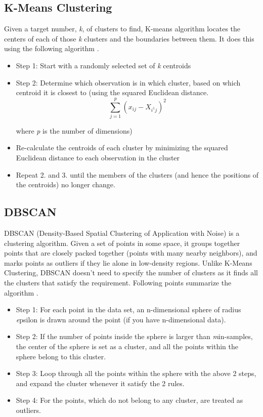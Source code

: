 \documentclass[9pt,twocolumn,twoside]{../../styles/osajnl}
\begin{document}
\subsection{K-Means Clustering}
Given a target number, \emph k, of clusters to find, K-means algorithm locates the centers of each of those \emph k clusters and the boundaries between them. It does this using the following algorithm \cite{www-kmeans}.
\begin{itemize}
    
    \item Step 1: Start with a randomly selected set of \emph k centroids 

    \item Step 2: Determine which observation is in which cluster, based on which centroid it is closest to (using the squared Euclidean distance. 
    \[   \sum_{j=1}^p (x_{ij} - X_{i^1j})^2   \]
    
    where \emph p is the number of dimensions)
    
    \item Re-calculate the centroids of each cluster by minimizing the squared Euclidean distance to each observation in the cluster
    
    \item Repeat 2. and 3. until the members of the clusters (and hence the positions of the centroids) no longer change.

\end{itemize}

\subsection{DBSCAN}
DBSCAN (Density-Based Spatial Clustering of Application with Noise) is a clustering algorithm. Given a set of points in some space, it groups together points that are closely packed together (points with many nearby neighbors), and marks points as outliers if they lie alone in low-density regions. Unlike K-Means Clustering, DBSCAN doesn't need to specify the number of clusters as it finds all the clusters that satisfy the requirement. Following points summarize the algorithm \cite{www-dbscan}.

\begin{itemize}
    \item Step 1: For each point in the data set, an n-dimensional sphere of radius \emph epsilon is drawn around the point (if you have n-dimensional data).
    
    \item Step 2: If the number of points inside the sphere is larger than \emph min-samples, the center of the sphere is set as a cluster, and all the points within the sphere belong to this cluster.
    
    \item Step 3: Loop through all the points within the sphere with the above 2 steps, and expand the cluster whenever it satisfy the 2 rules.
    
    \item Step 4: For the points, which do not belong to any cluster, are treated as outliers. 
\end{itemize}
\end{document}

